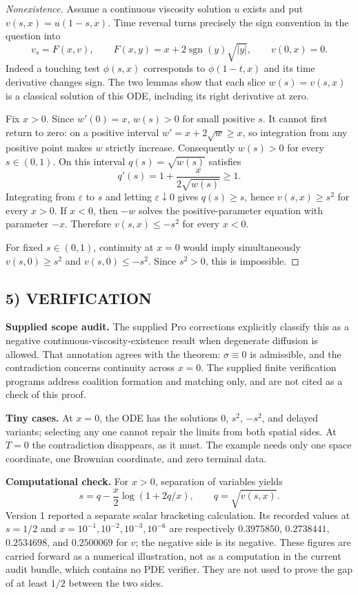 \documentclass[11pt,a4paper]{article}
\newcommand{\sgn}{\operatorname{sgn}}
\theoremstyle{definition}
\begin{document}
\begin{proof}[Nonexistence]
Assume a continuous viscosity solution $u$ exists and put $v(s,x)=u(1-s,x)$. Time reversal turns precisely the sign convention in the question into
\[
 v_s=F(x,v),\qquad F(x,y)=x+2\sgn(y)\sqrt{|y|},\qquad v(0,x)=0.
\]
Indeed a touching test $\phi(s,x)$ corresponds to $\phi(1-t,x)$ and its time derivative changes sign. The two lemmas show that each slice $w(s)=v(s,x)$ is a classical solution of this ODE, including its right derivative at zero.

Fix $x>0$. Since $w'(0)=x$, $w(s)>0$ for small positive $s$. It cannot first return to zero: on a positive interval $w'=x+2\sqrt w\ge x$, so integration from any positive point makes $w$ strictly increase. Consequently $w(s)>0$ for every $s\in(0,1)$. On this interval $q(s)=\sqrt{w(s)}$ satisfies
\[
 q'(s)=1+\frac{x}{2\sqrt{w(s)}}\ge1.
\]
Integrating from $\varepsilon$ to $s$ and letting $\varepsilon\downarrow0$ gives $q(s)\ge s$, hence $v(s,x)\ge s^2$ for every $x>0$. If $x<0$, then $-w$ solves the positive-parameter equation with parameter $-x$. Therefore $v(s,x)\le-s^2$ for every $x<0$.

For fixed $s\in(0,1)$, continuity at $x=0$ would imply simultaneously
$v(s,0)\ge s^2$ and $v(s,0)\le-s^2$. Since $s^2>0$, this is impossible.
\end{proof}

\subsection*{5) VERIFICATION}
\textbf{Supplied scope audit.} The supplied Pro corrections explicitly
classify this as a negative continuous-viscosity-existence result when
degenerate diffusion is allowed. That annotation agrees with the theorem:
$\sigma\equiv0$ is admissible, and the contradiction concerns continuity
across $x=0$. The supplied finite verification programs address coalition
formation and matching only, and are not cited as a check of this proof.

\textbf{Tiny cases.} At $x=0$, the ODE has the solutions $0$, $s^2$, $-s^2$, and delayed variants; selecting any one cannot repair the limits from both spatial sides. At $T=0$ the contradiction disappears, as it must. The example needs only one space coordinate, one Brownian coordinate, and zero terminal data.

\textbf{Computational check.} For $x>0$, separation of variables yields
\[
 s=q-\frac{x}{2}\log(1+2q/x),\qquad q=\sqrt{v(s,x)}.
\]
Version 1 reported a separate scalar bracketing calculation. Its recorded values at $s=1/2$ and $x=10^{-1},10^{-2},10^{-3},10^{-6}$ are respectively
$0.3975850$, $0.2738441$, $0.2534698$, and $0.2500069$ for $v$; the negative side is its negative. These figures are carried forward as a numerical illustration, not as a computation in the current audit bundle, which contains no PDE verifier. They are not used to prove the gap of at least $1/2$ between the two sides.
\end{document}
